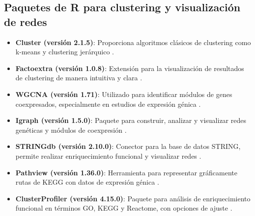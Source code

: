 \vspace{1cm}

\subsection*{Paquetes de R para clustering y visualización de redes}

\begin{itemize}
	\item \textbf{Cluster (versión 2.1.5)}: Proporciona algoritmos clásicos de clustering como k-means y clustering jerárquico \cite{cluster}.
	\item \textbf{Factoextra (versión 1.0.8)}: Extensión para la visualización de resultados de clustering de manera intuitiva y clara \cite{factoextra}.
	\item \textbf{WGCNA (versión 1.71)}: Utilizado para identificar módulos de genes coexpresados, especialmente en estudios de expresión génica \cite{wgcna}.
	\item \textbf{Igraph (versión 1.5.0)}: Paquete para construir, analizar y visualizar redes genéticas y módulos de coexpresión \cite{igraph}.
	\item \textbf{STRINGdb (versión 2.10.0)}: Conector para la base de datos STRING, permite realizar enriquecimiento funcional y visualizar redes \cite{stringdb}.
	\item \textbf{Pathview (versión 1.36.0)}: Herramienta para representar gráficamente rutas de KEGG con datos de expresión génica \cite{pathview}.
	\item \textbf{ClusterProfiler (versión 4.15.0)}: Paquete para análisis de enriquecimiento funcional en términos GO, KEGG y Reactome, con opciones de ajuste \cite{clusterprofiler}.
\end{itemize}


